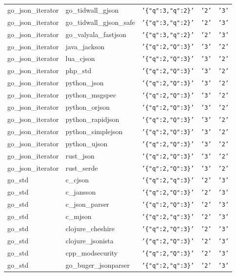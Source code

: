 \documentclass[english, 12pt, a4paper, sci, utf8, a-2b, online]{aaltothesis}
\def\str#1{\texttt{'#1'}}
\begin{document}
\begin{longtable}{lllll}
    go\_json\_iterator & go\_tidwall\_gjson & \str{\{"q":3,"q":2\}} & \str{2} & \str{3} \\
    go\_json\_iterator & go\_tidwall\_gjson\_safe & \str{\{"q":3,"q":2\}} & \str{2} & \str{3} \\
    go\_json\_iterator & go\_valyala\_fastjson & \str{\{"q":3,"q":2\}} & \str{2} & \str{3} \\
    go\_json\_iterator & java\_jackson & \str{\{"q":2,"Q":3\}} & \str{3} & \str{2} \\
    go\_json\_iterator & lua\_cjson & \str{\{"q":2,"Q":3\}} & \str{3} & \str{2} \\
    go\_json\_iterator & php\_std & \str{\{"q":2,"Q":3\}} & \str{3} & \str{2} \\
    go\_json\_iterator & python\_json & \str{\{"q":2,"Q":3\}} & \str{3} & \str{2} \\
    go\_json\_iterator & python\_msgspec & \str{\{"q":2,"Q":3\}} & \str{3} & \str{2} \\
    go\_json\_iterator & python\_orjson & \str{\{"q":2,"Q":3\}} & \str{3} & \str{2} \\
    go\_json\_iterator & python\_rapidjson & \str{\{"q":2,"Q":3\}} & \str{3} & \str{2} \\
    go\_json\_iterator & python\_simplejson & \str{\{"q":2,"Q":3\}} & \str{3} & \str{2} \\
    go\_json\_iterator & python\_ujson & \str{\{"q":2,"Q":3\}} & \str{3} & \str{2} \\
    go\_json\_iterator & rust\_json & \str{\{"q":2,"Q":3\}} & \str{3} & \str{2} \\
    go\_json\_iterator & rust\_serde & \str{\{"q":2,"Q":3\}} & \str{3} & \str{2} \\
    go\_std & c\_cjson & \str{\{"q":2,"q":3\}} & \str{2} & \str{3} \\
    go\_std & c\_jansson & \str{\{"q":2,"Q":3\}} & \str{2} & \str{3} \\
    go\_std & c\_json\_parser & \str{\{"q":2,"Q":3\}} & \str{2} & \str{3} \\
    go\_std & c\_mjson & \str{\{"q":2,"q":3\}} & \str{2} & \str{3} \\
    go\_std & clojure\_cheshire & \str{\{"q":2,"Q":3\}} & \str{2} & \str{3} \\
    go\_std & clojure\_jsonista & \str{\{"q":2,"Q":3\}} & \str{2} & \str{3} \\
    go\_std & cpp\_modsecurity & \str{\{"q":2,"Q":3\}} & \str{2} & \str{3} \\
    go\_std & go\_buger\_jsonparser & \str{\{"q":2,"q":3\}} & \str{2} & \str{3} \\

\end{longtable}
\end{document}
